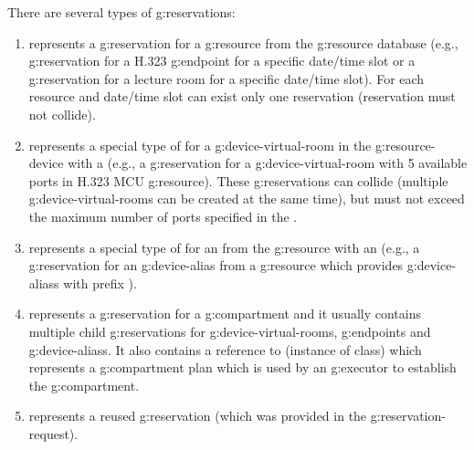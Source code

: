 There are several types of \glspl{g:reservation}:
\begin{enumerate}
\item {} represents a \gls{g:reservation} for a \gls{g:resource} from the \gls{g:resource} database (e.g., \gls{g:reservation} for a H.323 \gls{g:endpoint} for a specific date/time slot or a \gls{g:reservation} for a lecture room for a specific date/time slot). For each resource and date/time slot can exist only one reservation (reservation must not collide).

\item {} represents a special type of  for a \gls{g:device-virtual-room} in the \gls{g:resource-device} with a  (e.g., a \gls{g:reservation} for a \gls{g:device-virtual-room} with 5 available ports in H.323 MCU \gls{g:resource}). These \glspl{g:reservation} can collide (multiple \glspl{g:device-virtual-room} can be created at the same time), but must not exceed the maximum number of ports specified in the .

\item {} represents a special type of  for an  from the \gls{g:resource} with an  (e.g., a \gls{g:reservation} for an \gls{g:device-alias}  from a \gls{g:resource} which provides \glspl{g:device-alias} with prefix ).

\item {} represents a \gls{g:reservation} for a \gls{g:compartment} and it usually contains multiple child \glspl{g:reservation} for \glspl{g:device-virtual-room}, \glspl{g:endpoint} and \glspl{g:device-alias}. It also contains a reference to  (instance of  class) which represents a \gls{g:compartment} plan which is used by an \gls{g:executor} to establish the \gls{g:compartment}.

\item {} represents a reused \gls{g:reservation} (which was provided in the \gls{g:reservation-request}).
\end{enumerate}

